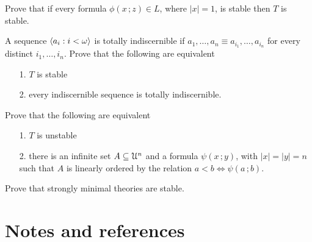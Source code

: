 \begin{exercise}
  Prove that if every formula $\phi(x\,;z)\in L$, where $|x|=1$, is stable then $T$ is stable.
\end{exercise}

\begin{exercise} 
  A sequence $\langle a_i:i<\omega\rangle$ is totally indiscernible if $a_1,\dots,a_n\equiv a_{i_1},\dots,a_{i_n}$ for every distinct $i_1,\dots,i_n$.
  Prove that the following are equivalent
  \begin{itemize}
  \item[1.] $T$ is stable
  \item[2.] every indiscernible sequence is totally indiscernible.
  \end{itemize}
\end{exercise}

\begin{exercise}\label{ex_stable_orderproperty}
Prove that the following are equivalent
\begin{itemize}
\item[1.] $T$ is unstable
\item[2.] there is an infinite set $A\subseteq\EuScript U^n$ and a formula  $\psi(x\,;y)$, with $|x|=|y|=n$ such that $A$ is linearly ordered by the relation $a<b\iff\psi(a\,;b)$.
\end{itemize}
\end{exercise}

\begin{exercise}
Prove that strongly minimal theories are stable.
\end{exercise}

\section{Notes and references}
\begin{biblist}[]\normalsize
{}\smallskip
  \smallskip
{}\smallskip
\end{biblist}